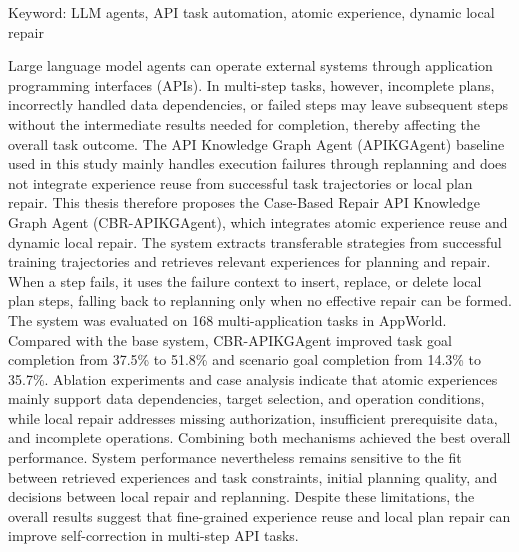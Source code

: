 \begin{EnAbstract}
    \begin{EnAbstractItems}
        \noindent \text Keyword: LLM agents, API task automation, atomic experience, dynamic local repair

    \end{EnAbstractItems}

    \begin{EnAbstractDescription}
        Large language model agents can operate external systems through application programming interfaces (APIs). In multi-step tasks, however, incomplete plans, incorrectly handled data dependencies, or failed steps may leave subsequent steps without the intermediate results needed for completion, thereby affecting the overall task outcome. The API Knowledge Graph Agent (APIKGAgent) baseline used in this study mainly handles execution failures through replanning and does not integrate experience reuse from successful task trajectories or local plan repair. This thesis therefore proposes the Case-Based Repair API Knowledge Graph Agent (CBR-APIKGAgent), which integrates atomic experience reuse and dynamic local repair. The system extracts transferable strategies from successful training trajectories and retrieves relevant experiences for planning and repair. When a step fails, it uses the failure context to insert, replace, or delete local plan steps, falling back to replanning only when no effective repair can be formed.
        The system was evaluated on 168 multi-application tasks in AppWorld. Compared with the base system, CBR-APIKGAgent improved task goal completion from 37.5\% to 51.8\% and scenario goal completion from 14.3\% to 35.7\%. Ablation experiments and case analysis indicate that atomic experiences mainly support data dependencies, target selection, and operation conditions, while local repair addresses missing authorization, insufficient prerequisite data, and incomplete operations. Combining both mechanisms achieved the best overall performance. System performance nevertheless remains sensitive to the fit between retrieved experiences and task constraints, initial planning quality, and decisions between local repair and replanning. Despite these limitations, the overall results suggest that fine-grained experience reuse and local plan repair can improve self-correction in multi-step API tasks.
    \end{EnAbstractDescription}
\end{EnAbstract}
